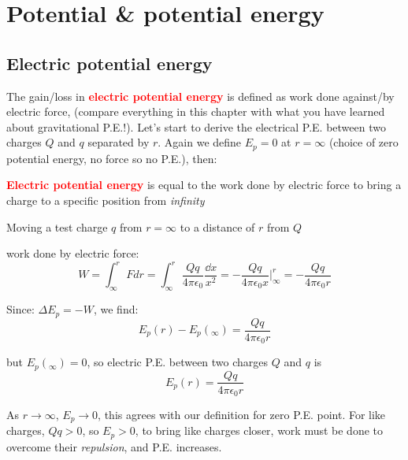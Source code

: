 \documentclass[a4paper,12pt]{book}
\newenvironment{ilight}
  {\centering
  	\vspace*{6pt}
  	\begin{tcolorbox}[colframe=Gray,colback=LightGrey!15]
  \setlength{\baselineskip}{\baselineskip}%
  }
  {\end{tcolorbox}\vspace*{-4pt}}
\newcommand{\keypoint}[1]{\textbf{\textcolor{red}{#1}}}
\newcommand{\ec}{4\pi\epsilon_0}
\newcommand{\tcbhighmath}[1]{\boxed{#1}}
\newcommand{\keypoint}[1]{\textbf{\textcolor{red}{#1}}}
\begin{document}
\section{Potential \& potential energy }

\subsection{Electric potential energy}
\label{sec:electric-potential}

The gain/loss in \keypoint{electric potential energy} is defined as work done against/by electric force, (compare everything in this chapter with what you have learned about gravitational P.E.!). Let's start to derive the electrical P.E. between two charges $Q$ and $q$ separated by $r$. Again we define $E_p=0$ at $r=\infty$ (choice of zero potential energy, no force so no P.E.), then:

\begin{ilight}
	\keypoint{Electric potential energy} is equal to the work done by electric force to bring a charge to a specific position from \emph{infinity}
\end{ilight} 

Moving a test charge $q$ from $r=\infty$ to a distance of $r$ from $Q$

\begin{center}
\end{center}

work done by electric force: $$W=\int^r_\infty F dr = \int^r_\infty \frac{Qq}{\ec} \frac{\dd x}{x^2} = - \frac{Qq}{\ec x}\bigg|^r_\infty = - \frac{Qq}{\ec r} $$

Since: $\Delta E_p=-W$, we find: $$E_p(r) - E_p(_\infty) = \frac{Qq}{\ec r}$$

but $E_p(_\infty) = 0$,  so electric P.E. between two charges $Q$ and $q$ is $$\tcbhighmath{E_p(r) = \frac{Qq}{\ec r}}$$

As $r \to \infty$, $E_p \to 0$, this agrees with our definition for zero P.E. point. For like charges, $Qq > 0$, so $E_p > 0$, to bring like charges closer, work must be done to overcome their \emph{repulsion}, and P.E. increases.
\end{document}
